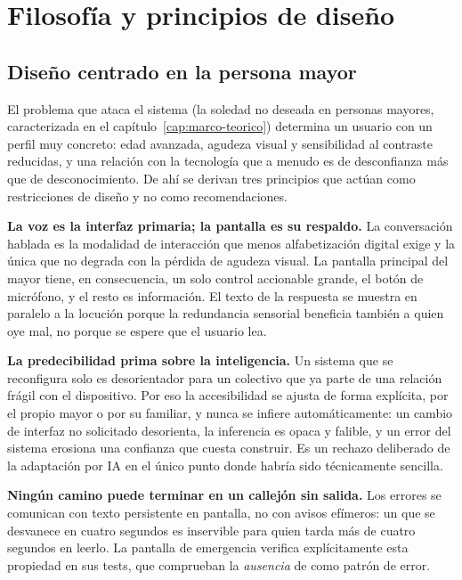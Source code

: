 
\section{Filosofía y principios de diseño}

\subsection{Diseño centrado en la persona mayor}

El problema que ataca el sistema (la soledad no deseada en personas mayores, caracterizada en el capítulo~\ref{cap:marco-teorico}) determina un usuario con un perfil muy concreto: edad avanzada, agudeza visual y sensibilidad
al contraste reducidas, y una relación con la tecnología que a menudo es de desconfianza más que de
desconocimiento. De ahí se derivan tres principios que actúan como restricciones de diseño y no como
recomendaciones.

\textbf{La voz es la interfaz primaria; la pantalla es su respaldo.} La conversación hablada es la
modalidad de interacción que menos alfabetización digital exige y la única que no degrada con la pérdida
de agudeza visual. La pantalla principal del mayor tiene, en consecuencia, un solo control accionable
grande, el botón de micrófono, y el resto es información. El texto de la respuesta se muestra en
paralelo a la locución porque la redundancia sensorial beneficia también a quien oye mal, no porque se
espere que el usuario lea.

\textbf{La predecibilidad prima sobre la inteligencia.} Un sistema que se reconfigura solo es
desorientador para un colectivo que ya parte de una relación frágil con el dispositivo. Por eso la
accesibilidad se ajusta de forma explícita, por el propio mayor o por su familiar, y nunca se infiere
automáticamente: un cambio de interfaz no solicitado desorienta, la inferencia es opaca y falible, y un
error del sistema erosiona una confianza que cuesta construir. Es un rechazo deliberado de la adaptación
por IA en el único punto donde habría sido técnicamente sencilla.

\textbf{Ningún camino puede terminar en un callejón sin salida.} Los errores se comunican con texto
persistente en pantalla, no con avisos efímeros: un  que se desvanece en cuatro segundos es
inservible para quien tarda más de cuatro segundos en leerlo. La pantalla de emergencia verifica
explícitamente esta propiedad en sus tests, que comprueban la \emph{ausencia} de  como
patrón de error.

